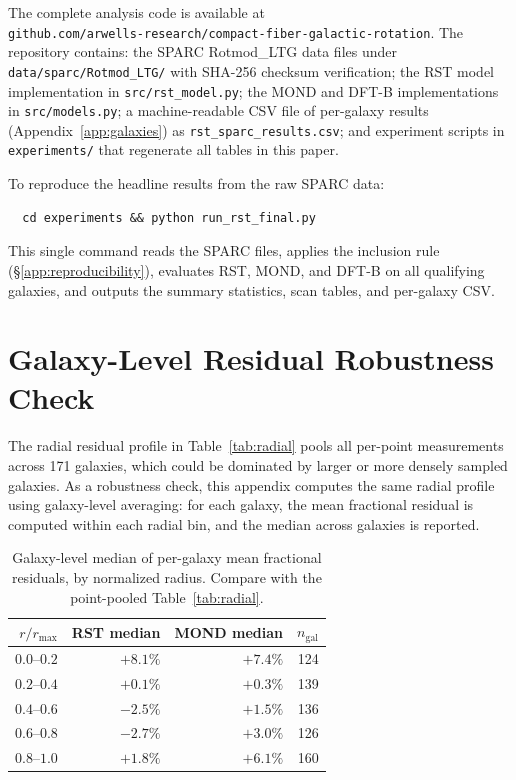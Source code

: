 \documentclass[11pt,a4paper]{article}
\begin{document}
The complete analysis code is available at\\\texttt{github.com/arwells-research/compact-fiber-galactic-rotation}.
The repository contains:
the SPARC Rotmod\_LTG data files under \texttt{data/sparc/Rotmod\_LTG/} with SHA-256 checksum verification;
the RST model implementation in \texttt{src/rst\_model.py};
the MOND and DFT-B implementations in \texttt{src/models.py};
a machine-readable CSV file of per-galaxy results (Appendix~\ref{app:galaxies}) as \texttt{rst\_sparc\_results.csv};
and experiment scripts in \texttt{experiments/} that regenerate all tables in this paper.

To reproduce the headline results from the raw SPARC data:
\begin{verbatim}
  cd experiments && python run_rst_final.py
\end{verbatim}
This single command reads the SPARC files, applies the inclusion rule (\S\ref{app:reproducibility}), evaluates RST, MOND, and DFT-B on all qualifying galaxies, and outputs the summary statistics, scan tables, and per-galaxy CSV.

\section{Galaxy-Level Residual Robustness Check}
\label{app:robustness}

The radial residual profile in Table~\ref{tab:radial} pools all per-point measurements across 171 galaxies, which could be dominated by larger or more densely sampled galaxies.
As a robustness check, this appendix computes the same radial profile using galaxy-level averaging: for each galaxy, the mean fractional residual is computed within each radial bin, and the median across galaxies is reported.

\begin{table}[h]
\centering
\caption{Galaxy-level median of per-galaxy mean fractional residuals, by normalized radius. Compare with the point-pooled Table~\ref{tab:radial}.}
\label{tab:radial-robust}
\begin{tabular}{rrrr}
\toprule
$r/r_{\max}$ & RST median & MOND median & $n_{\mathrm{gal}}$ \\
\midrule
$0.0$--$0.2$ & $+8.1\%$ & $+7.4\%$ & 124 \\
$0.2$--$0.4$ & $+0.1\%$ & $+0.3\%$ & 139 \\
$0.4$--$0.6$ & $-2.5\%$ & $+1.5\%$ & 136 \\
$0.6$--$0.8$ & $-2.7\%$ & $+3.0\%$ & 126 \\
$0.8$--$1.0$ & $+1.8\%$ & $+6.1\%$ & 160 \\
\bottomrule
\end{tabular}
\end{table}
\end{document}
